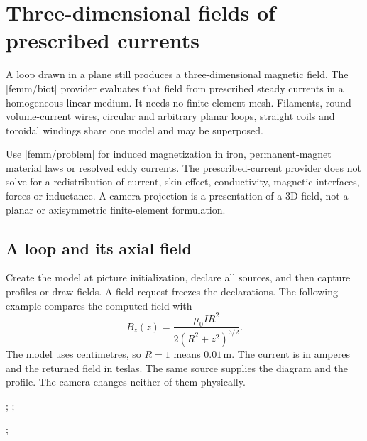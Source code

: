 \section{Three-dimensional fields of prescribed currents}
\label{sec:biot}

A loop drawn in a plane still produces a three-dimensional magnetic field.
The |femm/biot| provider evaluates that field from prescribed steady currents
in a homogeneous linear medium. It needs no finite-element mesh. Filaments,
round volume-current wires, circular and arbitrary planar loops, straight
coils and toroidal windings share one model and may be superposed.

Use |femm/problem| for induced magnetization in iron, permanent-magnet material
laws or resolved eddy currents. The prescribed-current provider does not solve
for a redistribution of current, skin effect, conductivity, magnetic interfaces,
forces or inductance. A camera projection is a presentation of a 3D field, not
a planar or axisymmetric finite-element formulation.

\subsection{A loop and its axial field}
Create the model at picture initialization, declare all sources, and then capture
profiles or draw fields. A field request freezes the declarations. The following
example compares the computed field with
\[
 B_z(z)=\frac{\mu_0 I R^2}{2(R^2+z^2)^{3/2}}.
\]
The model uses centimetres, so $R=1$ means $0.01\,\mathrm m$. The current is in
amperes and the returned field in teslas. The same source supplies the diagram
and the profile. The camera changes neither of them physically.
\begin{codeexample}[width=0pt]
\begingroup
{}
 \femmbiotsource[kind=loop,current=2,radius=1]
 \femmbiotprofile[name=biot-axis,from=0/0/-2,to=0/0/2,samples=61]
 ;
 ;
\endtikzpicture
\par
\tikzpicture
 \axis[width=8cm,height=5cm,no markers,grid=major,
 xlabel={$z$ (cm)},ylabel={$B_z$ (T)},legend style={at={(.5,-.32)},anchor=north,legend columns=2}]
  \femmbiotplot[profile=biot-axis,component=Bz,abscissa=z,
   plot options={blue!70!black,thick}]
  ;
 \endaxis
\endtikzpicture
\par
\endgroup
\end{codeexample}

